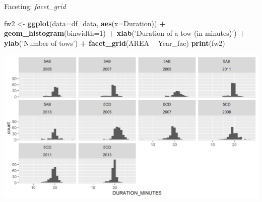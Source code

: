 \documentclass[
  ignorenonframetext,
]{beamer}
\newenvironment{Shaded}{\begin{snugshade}}{\end{snugshade}}
\newcommand{\DataTypeTok}[1]{\textcolor[rgb]{0.13,0.29,0.53}{#1}}
\newcommand{\DecValTok}[1]{\textcolor[rgb]{0.00,0.00,0.81}{#1}}
\newcommand{\KeywordTok}[1]{\textcolor[rgb]{0.13,0.29,0.53}{\textbf{#1}}}
\newcommand{\NormalTok}[1]{#1}
\newcommand{\OperatorTok}[1]{\textcolor[rgb]{0.81,0.36,0.00}{\textbf{#1}}}
\newcommand{\StringTok}[1]{\textcolor[rgb]{0.31,0.60,0.02}{#1}}
\begin{document}
\begin{frame}[fragile]{Faceting: \emph{facet\_grid}}
\protect\hypertarget{faceting-facet_grid-3}{}

\begin{Shaded}
\begin{Highlighting}[]
\NormalTok{fw2 <-}\StringTok{ }\KeywordTok{ggplot}\NormalTok{(}\DataTypeTok{data=}\NormalTok{df_data, }\KeywordTok{aes}\NormalTok{(}\DataTypeTok{x=}\NormalTok{Duration)) }\OperatorTok{+}
\StringTok{  }\KeywordTok{geom_histogram}\NormalTok{(}\DataTypeTok{binwidth=}\DecValTok{1}\NormalTok{) }\OperatorTok{+}\StringTok{ }
\StringTok{  }\KeywordTok{xlab}\NormalTok{(}\StringTok{'Duration of a tow (in minutes)'}\NormalTok{) }\OperatorTok{+}\StringTok{ }\KeywordTok{ylab}\NormalTok{(}\StringTok{'Number of tows'}\NormalTok{) }\OperatorTok{+}
\StringTok{  }\KeywordTok{facet_grid}\NormalTok{(AREA }\OperatorTok{~}\StringTok{ }\NormalTok{Year_fac)}
\KeywordTok{print}\NormalTok{(fw2)}
\end{Highlighting}
\end{Shaded}

\begin{center}\includegraphics[width=0.8\linewidth]{figure/facet_wrap_5-1} \end{center}

\end{frame}
\end{document}
